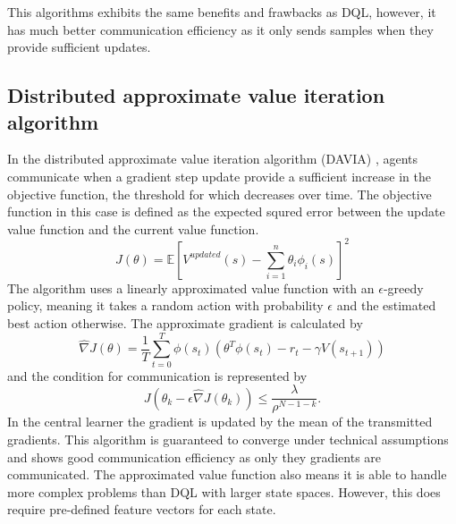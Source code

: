 This algorithms exhibits the same benefits and frawbacks as DQL, however, it has much better communication efficiency as it only sends samples when they provide sufficient updates.

\subsection{Distributed approximate value iteration algorithm}
In the distributed approximate value iteration algorithm (DAVIA) \cite{DAVIA}, agents communicate when a gradient step update provide a sufficient increase in the objective function, the threshold for which decreases over time. The objective function in this case is defined as the expected squred error between the update value function and the current value function. 
\begin{equation*}
    J(\theta) = \mathbb{E}[V^{updated}(s) - \sum_{i=1}^n \theta_i \phi_i(s)]^2
\end{equation*} 
The algorithm uses a linearly approximated value function with an $\epsilon$-greedy policy, meaning it takes a random action with probability $\epsilon$ and the estimated best action otherwise.
The approximate gradient is calculated by
\begin{equation*}
    \hat{\nabla}J(\theta) = \frac{1}{T} \sum^T_{t=0} \phi(s_t)(\theta^T \phi(s_t) - r_t - \gamma V(s_{t+1}))
\end{equation*}
and the condition for communication is represented by 
\begin{equation*}
    J(\theta_k - \epsilon \hat{\nabla}J(\theta_k)) \leq \frac{\lambda}{\rho^{N-1-k}}.
\end{equation*}
In the central learner the gradient is updated by the mean of the transmitted gradients. This algorithm is guaranteed to converge under technical assumptions and shows good communication efficiency as only they gradients are communicated. The approximated value function also means it is able to handle more complex problems than DQL with larger state spaces. However, this does require pre-defined feature vectors for each state.

